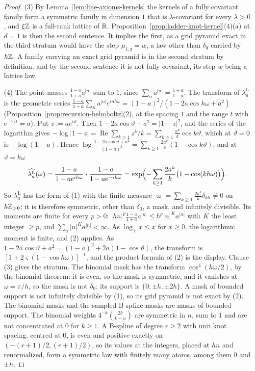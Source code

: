 \begin{proof}
(3) By Lemma~\ref{lem:line-axioms-kernels} the kernels of a fully covariant family form a
symmetric family in dimension $1$ that is $\lambda$-covariant for every $\lambda > 0$, and $\xi\mathbb{Z}$
is a full-rank lattice of $\mathbb{R}$. Proposition~\ref{prop:ladder-knot-kernel}(4)(a) at $d = 1$ is
then the second sentence. It implies
the first, as a grid pyramid exact in the third stratum would have the step $\mu_{1,q} = w$, a law
other than $\delta_0$ carried by $h\mathbb{Z}$. A family carrying an exact grid pyramid is in the second
stratum by definition, and by the second sentence it is not fully covariant, its step $w$ being a
lattice law.

(4) The point masses $\tfrac{1-a}{1+a}a^{|n|}$ sum to $1$, since $\sum_na^{|n|} = \tfrac{1+a}{1-a}$.
The transform of $\lambda^{\mathrm{L}}_a$ is the geometric series
$\tfrac{1-a}{1+a}\sum_na^{|n|}e^{inh\omega} = (1-a)^2/(1 - 2a\cos h\omega + a^2)$
(Proposition~\ref{prop:recursion-helmholtz}(2), at the spacing $1$ and the range $t$ with
$e^{-1/t} = a$). Put $z := ae^{i\vartheta}$. Then $1 - 2a\cos\vartheta + a^2 = |1 - z|^2$, and the
series of the logarithm gives
$-\log|1 - z| = \operatorname{Re}\sum_{k \ge 1}z^k/k = \sum_{k \ge 1}\tfrac{a^k}{k}\cos k\vartheta$,
which at $\vartheta = 0$ is $-\log(1 - a)$. Hence
$\log\tfrac{1 - 2a\cos\vartheta + a^2}{(1-a)^2} = \sum_{k \ge 1}\tfrac{2a^k}{k}(1 - \cos k\vartheta)$,
and at $\vartheta = h\omega$
\[
  \widehat{\lambda^{\mathrm{L}}_a}(\omega) = \frac{1-a}{1 - ae^{ih\omega}}\cdot\frac{1-a}{1 - ae^{-ih\omega}}
  = \exp\Bigl(-\sum_{k \ge 1}\frac{2a^k}{k}\bigl(1 - \cos(kh\omega)\bigr)\Bigr) .
\]
So $\lambda^{\mathrm{L}}_a$ has the form of (1) with the finite measure
$\varpi = \sum_{k \ge 1}\tfrac{2a^k}{k}\delta_{kh} \ne 0$ on $h\mathbb{Z}_{>0}$; it is therefore symmetric,
other than $\delta_0$, a mask, and infinitely divisible. Its moments are finite for every $p > 0$:
$|hn|^p\tfrac{1-a}{1+a}a^{|n|} \le h^p|n|^Ka^{|n|}$ with $K$ the least integer $\ge p$, and
$\sum_n|n|^Ka^{|n|} < \infty$. As $\log_+x \le x$ for $x \ge 0$, the logarithmic moment is finite,
and (2) applies. As $1 - 2a\cos\vartheta + a^2 = (1-a)^2 + 2a(1 - \cos\vartheta)$, the transform is
$[1 + 2\varsigma(1 - \cos h\omega)]^{-1}$, and the product formula of (2) is the display. Clause
(3) gives the stratum. The binomial mask has the transform $\cos^4(h\omega/2)$, by the binomial
theorem: it is even, so the mask is symmetric, and it vanishes at $\omega = \pi/h$, so the mask is
not $\delta_0$; its support is $\{0, \pm h, \pm2h\}$. A mask of bounded support is not infinitely
divisible by (1), so its grid pyramid is not exact by (2). The binomial masks and the sampled B-spline masks
are masks of bounded support. The binomial weights $4^{-k}\binom{2k}{k+n}$ are symmetric in
$n$, sum to $1$ and are not concentrated at $0$ for $k \ge 1$. A B-spline of degree $r \ge 2$
with unit knot spacing, centred at $0$, is even and positive exactly on $(-(r+1)/2, (r+1)/2)$, so its
values at the integers, placed at $hn$ and renormalized, form a symmetric law with finitely many
atoms, among them $0$ and $\pm h$.


\end{proof}
